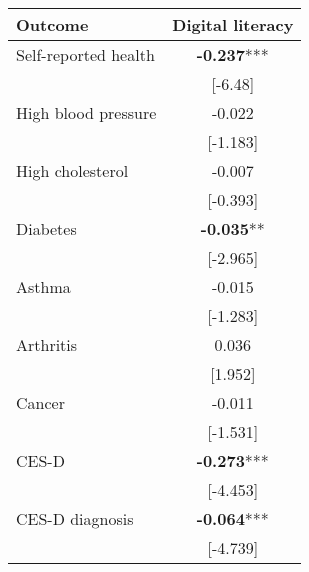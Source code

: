 \documentclass[11pt]{article}
\begin{document}
    \begin{tabular}{lc}
        \toprule
        Outcome & Digital literacy \\
        \midrule
        Self-reported health & \textbf{-0.237}*** \\
        & [-6.48] \\
        High blood pressure & -0.022 \\
        & [-1.183] \\
        High cholesterol & -0.007 \\
        & [-0.393] \\
        Diabetes & \textbf{-0.035}** \\
        & [-2.965] \\
        Asthma & -0.015 \\
        & [-1.283] \\
        Arthritis & 0.036 \\
        & [1.952] \\
        Cancer & -0.011 \\
        & [-1.531] \\
        CES-D & \textbf{-0.273}*** \\
        & [-4.453] \\
        CES-D diagnosis & \textbf{-0.064}*** \\
        & [-4.739] \\
        \bottomrule
    \end{tabular}
\end{document}
